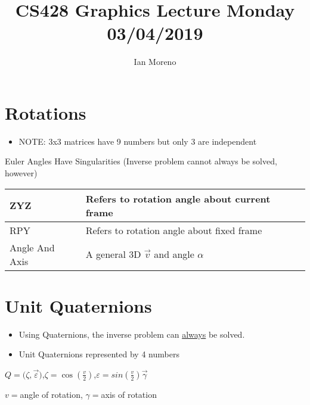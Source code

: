 \documentclass{article}
\title{CS428 Graphics Lecture Monday 03/04/2019}
\author{Ian Moreno}
\begin{document}
	\maketitle 
	
	\section{Rotations}

	\begin{itemize}
		\item  NOTE: 3x3 matrices have 9 numbers but only 3 are independent
	\end{itemize}
	\begin{table}[h]
		\begin{center}
			{\small Euler Angles Have Singularities (Inverse problem cannot always be solved, however)}
			\linebreak
		{\renewcommand{\arraystretch}{2}%
			\begin{tabular}{|l|l|}
				\hline
				ZYZ & Refers to rotation angle about current frame \\
				\hline
				RPY & Refers to rotation angle about fixed frame \\
				\hline
				Angle And Axis & A general 3D $\vec{v}$ and angle $\alpha$ \\
				\hline
		\end{tabular}} \quad
		\end{center}
	\end{table}
	
	\section{Unit Quaternions}
	\begin{itemize}
		\item  Using Quaternions, the inverse problem can \underline{always} be solved.
		\item Unit Quaternions represented by 4 numbers
	\end{itemize}
	
	$Q = ($\space$\zeta, \vec{\varepsilon}$\space$)$\space,\space$\zeta = \cos(\frac{v}{2})$,\space$\varepsilon = sin(\frac{v}{2})\vec{\gamma}$
	\begin{center}$v =$\space angle of rotation, $\gamma =$\space axis of rotation \end{center}
\end{document}
